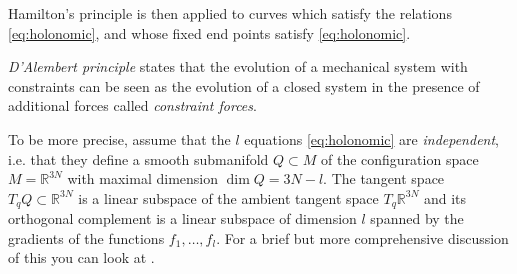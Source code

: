 \documentclass[english,fontsize=11pt,paper=a5,oneside]{scrbook}
\newcommand{\R}{\mathbb{R}}
\theoremstyle{definition}
\begin{document}
Hamilton's principle is then applied to curves which satisfy the relations \eqref{eq:holonomic}, and whose fixed end points satisfy \eqref{eq:holonomic}.

\begin{tcolorbox}
    \emph{D'Alembert principle} states that the evolution of a mechanical system with constraints can be seen as the evolution of a closed system in the presence of additional forces called \emph{constraint forces}.
\end{tcolorbox}

To be more precise, assume that the $l$ equations \eqref{eq:holonomic} are \emph{independent}, i.e. that they define a smooth submanifold $Q\subset M$ of the configuration space $M=\R^{3N}$ with maximal dimension $\dim Q = 3N-l$.
The tangent space $T_qQ \subset \R^{3N}$ is a linear subspace of the ambient tangent space $T_q \R^{3N}$ and its orthogonal complement is a linear subspace of dimension $l$ spanned by the gradients of the functions $f_1, \ldots, f_l$. 
For a brief but more comprehensive discussion of this you can look at \cite[Chapter 2.8]{lectures:aom:seri}.
\end{document}
